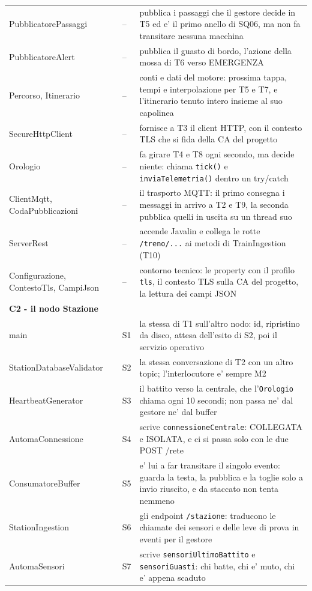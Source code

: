 \documentclass[11pt]{article}
\begin{document}
{\begin{longtable}{L{0.30\textwidth}L{0.13\textwidth}L{0.44\textwidth}}
PubblicatorePassaggi & -- & pubblica i passaggi che il gestore decide in T5 ed e' il primo anello di SQ06, ma non fa transitare nessuna macchina\\
PubblicatoreAlert & -- & pubblica il guasto di bordo, l'azione della mossa di T6 verso EMERGENZA\\
Percorso, Itinerario & -- & conti e dati del motore: prossima tappa, tempi e interpolazione per T5 e T7, e l'itinerario tenuto intero insieme al suo capolinea\\
SecureHttpClient & -- & fornisce a T3 il client HTTP, con il contesto TLS che si fida della CA del progetto\\
Orologio & -- & fa girare T4 e T8 ogni secondo, ma decide niente: chiama \texttt{tick()} e \texttt{inviaTelemetria()} dentro un try/catch\\
ClientMqtt, CodaPubblicazioni & -- & il trasporto MQTT: il primo consegna i messaggi in arrivo a T2 e T9, la seconda pubblica quelli in uscita su un thread suo\\
ServerRest & -- & accende Javalin e collega le rotte \texttt{/treno/...} ai metodi di TrainIngestion (T10)\\
Configurazione, ContestoTls, CampiJson & -- & contorno tecnico: le property con il profilo \texttt{tls}, il contesto TLS sulla CA del progetto, la lettura dei campi JSON\\
\hline
\textbf{C2 - il nodo Stazione} &  & \\
main & S1 & la stessa di T1 sull'altro nodo: id, ripristino da disco, attesa dell'esito di S2, poi il servizio operativo\\
StationDatabaseValidator & S2 & la stessa conversazione di T2 con un altro topic; l'interlocutore e' sempre M2\\
HeartbeatGenerator & S3 & il battito verso la centrale, che l'\texttt{Orologio} chiama ogni 10 secondi; non passa ne' dal gestore ne' dal buffer\\
AutomaConnessione & S4 & scrive \texttt{connessioneCentrale}: COLLEGATA e ISOLATA, e ci si passa solo con le due POST /rete\\
ConsumatoreBuffer & S5 & e' lui a far transitare il singolo evento: guarda la testa, la pubblica e la toglie solo a invio riuscito, e da staccato non tenta nemmeno\\
StationIngestion & S6 & gli endpoint \texttt{/stazione}: traducono le chiamate dei sensori e delle leve di prova in eventi per il gestore\\
AutomaSensori & S7 & scrive \texttt{sensoriUltimoBattito} e \texttt{sensoriGuasti}: chi batte, chi e' muto, chi e' appena scaduto\\

\end{longtable}}
\end{document}

